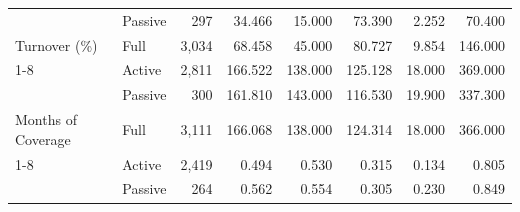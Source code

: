 \begin{table}[!htbp]
{\begin{tabular}[t]{llrrrrrr}
 & Passive & 297 & 34.466 & 15.000 & 73.390 & 2.252 & 70.400\\

\multirow{-3}{*}{\raggedright\arraybackslash Turnover (\%)} & Full & 3,034 & 68.458 & 45.000 & 80.727 & 9.854 & 146.000\\
\cmidrule{1-8}
 & Active & 2,811 & 166.522 & 138.000 & 125.128 & 18.000 & 369.000\\

 & Passive & 300 & 161.810 & 143.000 & 116.530 & 19.900 & 337.300\\

\multirow{-3}{*}{\raggedright\arraybackslash Months of Coverage} & Full & 3,111 & 166.068 & 138.000 & 124.314 & 18.000 & 366.000\\
\cmidrule{1-8}
 & Active & 2,419 & 0.494 & 0.530 & 0.315 & 0.134 & 0.805\\

 & Passive & 264 & 0.562 & 0.554 & 0.305 & 0.230 & 0.849\\


\end{tabular}}
\end{table}
